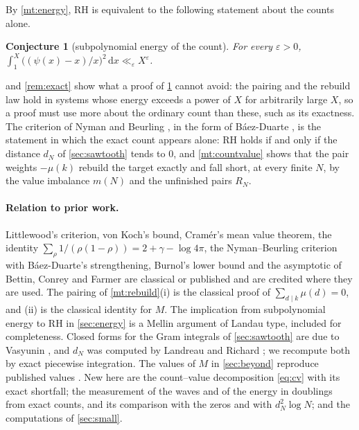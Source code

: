 \documentclass[11pt]{article}
\newtheorem{conjecture}{Conjecture}
\theoremstyle{definition}\newtheorem{definition}[theorem]{Definition}
\theoremstyle{remark}\newtheorem{remark}[theorem]{Remark}
\newcommand{\dd}{\,\mathrm d}\newcommand{\e}{\mathrm e}
\begin{document}
By \cref{mt:energy}, RH is equivalent to the following statement about the counts alone.

\begin{conjecture}[subpolynomial energy of the count]\label{conj:energy}
For every $\varepsilon>0$, $\int_1^X\bigl((\psi(x)-x)/x\bigr)^2\dd x\ll_\varepsilon X^{\varepsilon}$.
\end{conjecture}

 and \cref{rem:exact} show what a proof of \cref{conj:energy} cannot avoid: the pairing and the rebuild law hold in systems whose energy exceeds a power of $X$ for arbitrarily large $X$, so a proof must use more about the ordinary count than these, such as its exactness. The criterion of Nyman and Beurling \cite{Beurling}, in the form of B\'aez-Duarte \cite{BaezDuarte}, is the statement in which the exact count appears alone: RH holds if and only if the distance $d_N$ of \cref{sec:sawtooth} tends to $0$, and \cref{mt:countvalue} shows that the pair weights $-\mu(k)$ rebuild the target exactly and fall short, at every finite $N$, by the value imbalance $m(N)$ and the unfinished pairs $R_N$.

\paragraph{Relation to prior work.} Littlewood's criterion, von Koch's bound, Cramér's mean value theorem, the identity $\sum_\rho1/(\rho(1-\rho))=2+\gamma-\log4\pi$, the Nyman--Beurling criterion with B\'aez-Duarte's strengthening, Burnol's lower bound and the asymptotic of Bettin, Conrey and Farmer are classical or published and are credited where they are used. The pairing of \cref{mt:rebuild}(i) is the classical proof of $\sum_{d\mid k}\mu(d)=0$, and (ii) is the classical identity for $M$. The implication from subpolynomial energy to RH in \cref{sec:energy} is a Mellin argument of Landau type, included for completeness. Closed forms for the Gram integrals of \cref{sec:sawtooth} are due to Vasyunin \cite{Vasyunin}, and $d_N$ was computed by Landreau and Richard \cite{LandreauRichard}; we recompute both by exact piecewise integration. The values of $M$ in \cref{sec:beyond} reproduce published values \cite{OEISM,OEISM2}. New here are the count--value decomposition \eqref{eq:cv} with its exact shortfall; the measurement of the waves and of the energy in doublings from exact counts, and its comparison with the zeros and with $d_N^2\log N$; and the computations of \cref{sec:small}.
\end{document}
